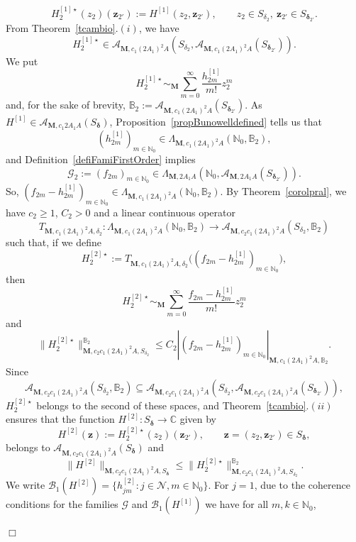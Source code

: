 \documentclass[11pt,a4paper,leqno]{article}
\theoremstyle{plain}
\theoremstyle{definition}
\newenvironment{proof1}{\medskip\par\noindent{\bf Proof}}{\hfill $\Box$
\medskip\par}
\def\C{\mathbb{C}}
\def\N{\mathbb{N}}
\def\bdelta{\boldsymbol{\delta}}
\def\bM{\boldsymbol{M}}
\def\bz{\boldsymbol{z}}
\begin{document}
\begin{proof1}
$$
H_{2}^{[1]\star}(z_{2})(\bz_{2'}):=H^{[1]}(z_{2},\bz_{2'}),\qquad z_{2}\in S_{\delta_{2}},\ \bz_{2'}\in S_{\bdelta_{2'}}.
$$
From Theorem~\ref{tcambio}.$(i)$, we have
$$
H_{2}^{[1]\star}\in\mathcal{A}_{\bM,c_{1}(2A_{1})^{2}A}(S_{\delta_{2}},\mathcal{A}_{\bM,c_1(2  A_{1})^{2}A}(S_{\bdelta_{2'}})).
$$
We put
$$
H_{2}^{[1]\star}\sim_{\bM}\sum_{m=0}^{\infty}\frac{h_{2m}^{[1]}}{m!}z_{2}^{m}
$$
and, for the sake of brevity, $\mathbb{B}_{2}:=\mathcal{A}_{\bM,c_{1}(2A_{1})^{2}A}(S_{\bdelta_{2'}})$.
As $H^{[1]}\in\mathcal{A}_{\bM,c_{1}2A_{1}A}(S_{\bdelta})$, Proposition~\ref{propBunowelldefined} tells us that
$$
(h_{2m}^{[1]})_{m\in\N_{0}}\in\Lambda_{\bM,c_{1}(2A_{1})^{2}A}(\N_0,\mathbb{B}_{2}),
$$
and Definition~\ref{defiFamiFirstOrder} implies
$$
\mathcal{G}_{2}:=(f_{2m})_{m\in\N_{0}}\in \Lambda_{\bM,2A_{1}A}(\N_0,\mathcal{A}_{\bM,2A_{1}A}(S_{\bdelta_{2'}})).
$$
So, $(f_{2m}-h_{2m}^{[1]})_{m\in\N_{0}}\in\Lambda_{\bM,c_{1}(2A_{1})^{2}A}(\N_0,\mathbb{B}_{2})$.
By Theorem~\ref{corolpral}, we have $c_{2}\ge 1$, $C_{2}>0$ and a linear continuous operator
$$
T_{\bM,c_{1}(2A_{1})^{2}A,\delta_{2}}:\Lambda_{\bM,c_{1}(2A_{1})^{2}A}(\N_0,\mathbb{B}_2) \longrightarrow \mathcal{A}_{\bM,c_{2}c_{1}(2A_{1})^{2}A}(S_{\delta_{2}},\mathbb{B}_2)
$$
such that, if we define
$$
H_{2}^{[2]\star}:=T_{\bM,c_{1}(2A_{1})^{2}A,\delta_{2}}\big((f_{2m}-h_{2m}^{[1]})_{m\in\N_{0}}\big),
$$
then
\begin{equation}\label{desaasinh22star}
H_{2}^{[2]\star}\sim_{\bM}\sum_{m=0}^{\infty}\frac{f_{2m}-h^{[1]}_{2m}}{m!}z_{2}^{m}
\end{equation}
and
$$
\|H_{2}^{[2]\star}\|_{\bM,c_{2}c_{1}(2A_{1})^{2}A,S_{\delta_{2}}}^{\mathbb{B}_2}\le C_{2}|(f_{2m}-h_{2m}^{[1]})_{m\in\N_{0}}|_{\bM,c_{1}(2A_{1})^{2}A,\mathbb{B}_{2}}.
$$
Since
$$
\mathcal{A}_{\bM,c_{2}c_{1}(2A_{1})^{2}A}(S_{\delta_{2}},\mathbb{B}_{2})\subseteq \mathcal{A}_{\bM,c_{2}c_{1}(2A_{1})^{2}A}(S_{\delta_{2}}, \mathcal{A}_{\bM,c_{2}c_{1}(2A_{1})^{2}A}(S_{\bdelta_{2'}})),
$$
$H_{2}^{[2]\star}$ belongs to the second of these spaces, and Theorem~\ref{tcambio}.$(ii)$ ensures that the function $H^{[2]}:S_{\bdelta}\to \C$ given by
$$H^{[2]}(\bz):=H^{[2]\star}_2(z_{2})(\bz_{2'}),\qquad \bz=(z_2,\bz_{2'})\in S_{\bdelta},
$$
belongs to $\mathcal{A}_{\bM,c_{2}c_{1}(2A_{1})^{2}A}(S_{\bdelta})$ and
$$
\|H^{[2]}\|_{\bM,c_{2}c_{1}(2A_{1})^{2}A,S_{\bdelta}}\le \|H^{[2]\star}_{2}\|_{\bM,c_2c_{1}(2A_{1})^{2}A,S_{\delta_{2}}}^{\mathbb{B}_2}.
$$
We write $\mathcal{B}_{1}(H^{[2]})=\{h_{jm}^{[2]}: j\in\mathcal{N}, m\in\N_{0}\}$. For $j=1$, due to the coherence conditions for the families $\mathcal{G}$ and $\mathcal{B}_{1}(H^{[1]})$ we have for all $m,k\in\N_{0}$,

\end{proof1}
\end{document}
